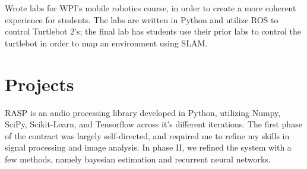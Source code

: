 \documentclass[letterpaper]{deedy-resume} %
\begin{document}
\sectionspace %



\begin{tightitemize}
\item Wrote labs for WPI's mobile robotics course, in order to create a more coherent experience for students.  The labs are written in Python and utilize ROS to control Turtlebot 2's; the final lab has students use their prior labs to control the turtlebot in order to map an environment using SLAM.
\end{tightitemize}

\sectionspace %


%
%






\section{Projects}

RASP is an audio processing library developed in Python, utilizing Numpy, SciPy, Scikit-Learn, and Tensorflow across it's different iterations.  The first phase of the contract was largely self-directed, and required me to refine my skills in signal processing and image analysis.  In phase II, we refined the system with a few methods, namely bayesian estimation and recurrent neural networks.
\end{document}
